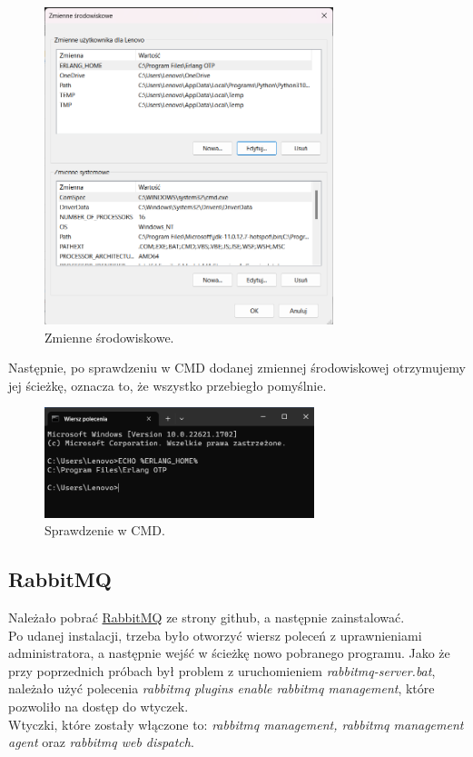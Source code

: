 \documentclass[12pt,twoside]{article}
\begin{document}
\begin{figure}[!htb]
	\centering
	\includegraphics[width=0.75\textwidth]{figures/fig3.png}
	\caption{Zmienne środowiskowe.}
	\label{fig:fig3}
\end{figure}

Następnie, po sprawdzeniu w CMD dodanej zmiennej środowiskowej otrzymujemy jej ścieżkę, oznacza to, że wszystko przebiegło pomyślnie.

\begin{figure}[!htb]
	\centering
	\includegraphics[width=0.7\textwidth]{figures/fig4.png}
	\caption{Sprawdzenie w CMD.}
	\label{fig:fig4}
\end{figure}

\subsection{RabbitMQ}
Należało pobrać \href{https://github.com/rabbitmq/rabbitmq-server/}{RabbitMQ} ze strony github, a następnie zainstalować.\\
Po udanej instalacji, trzeba było otworzyć wiersz poleceń z uprawnieniami administratora, a następnie wejść w ścieżkę nowo pobranego programu. Jako że przy poprzednich próbach był problem z uruchomieniem \textit{rabbitmq-server.bat}, należało użyć polecenia \textit{rabbitmq plugins enable rabbitmq management}, które pozwoliło na dostęp do wtyczek. \\
Wtyczki, które zostały włączone to: \textit{rabbitmq management, rabbitmq management agent} oraz \textit{rabbitmq web dispatch}. 
\end{document}
